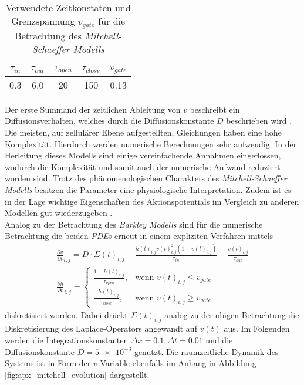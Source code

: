 \begin{table}[H]
\centering
\begin{tabular}{ccccc}
\hline 
$\tau_{in}$ & $\tau_{out}$ & $\tau_{open}$ & $\tau_{close}$ & $v_{gate}$ \\ 
\hline
0.3 & 6.0 & 20 & 150 & 0.13 \\ 
\hline 
\end{tabular} 
\caption{Verwendete Zeitkonstaten und Grenzspannung $v_{gate}$ für die Betrachtung des \textit{Mitchell-Schaeffer Modells}}
\label{tab:ms_parameters}
\end{table}

Der erste Summand der zeitlichen Ableitung von $v$ beschreibt ein Diffusionsverhalten, welches durch die Diffusionskonstante $D$ beschrieben wird \citep{talbot2013towards}.\\

Die meisten, auf zellulärer Ebene aufgestellten, Gleichungen haben eine hohe Komplexität. Hierdurch werden numerische Berechnungen sehr aufwendig. In der Herleitung dieses Modells sind einige vereinfachende Annahmen eingeflossen, wodurch die Komplexität und somit auch der numerische Aufwand reduziert worden sind. Trotz des phänomenologischen Charakters des \textit{Mitchell-Schaeffer Modells} besitzen die Parameter eine physiologische Interpretation. Zudem ist es in der Lage wichtige Eigenschaften des Aktionspotentials im Vergleich zu anderen Modellen gut wiederzugeben \citep{talbot2013towards}.\\

Analog zu der Betrachtung des \textit{Barkley Modells} sind für die numerische Betrachtung die beiden \textit{PDE}s erneut in einem expliziten Verfahren mittels
\begin{equation}
\begin{gathered}
\frac{\partial v}{\partial t}_{i,j} = D \cdot \Sigma(t)_{i,j} + \frac{h(t)_{i,j} v(t)_{i,j}^2(1-v(t)_{i,j})}{\tau_{in}} - \frac{v(t)_{i,j}}{\tau_{out}}\\
\frac{\partial h}{\partial t}_{i,j} = \begin{cases}
	\frac{1-h(t)_{i,j}}{\tau_{open}},& \text{wenn } v(t)_{i,j} \leq v_{gate}\\
    \frac{-h(t)_{i,j}}{\tau_{close}},& \text{wenn } v(t)_{i,j} \geq v_{gate}
\end{cases}
\end{gathered}
\end{equation}
diskretisiert worden. Dabei drückt $\Sigma(t)_{i, j}$ analog zu der obigen Betrachtung die Diskretisierung des Laplace-Operators angewandt auf $v(t)$ aus. Im Folgenden werden die Integrationskonstanten $\Delta x = 0.1, \Delta t = 0.01$ und die Diffusionskonstante $D = \num{5e-3}$ genutzt. Die raumzeitliche Dynamik des Systems ist in Form der $v$-Variable ebenfalls im Anhang in Abbildung \ref{fig:apx_mitchell_evolution} dargestellt.\\